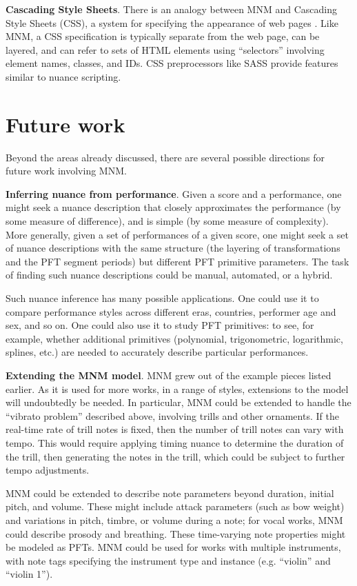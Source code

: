 \documentclass[letterpaper, 12pt]{article}
\begin{document}
\textbf{Cascading Style Sheets}.
There is an analogy between MNM and Cascading Style Sheets (CSS),
a system for specifying the appearance of web pages \citep{Lie1997}.
Like MNM, a CSS specification
is typically separate from the web page, can be layered,
and can refer to sets of HTML elements
using ``selectors'' involving element names, classes, and IDs.
CSS preprocessors like SASS \citep{Maxinanian2016}
provide features similar to nuance scripting.

\section{Future work}

Beyond the areas already discussed,
there are several possible directions for future work involving MNM.

\textbf{Inferring nuance from performance}.
Given a score and a performance,
one might seek a nuance description that
closely approximates the performance (by some measure of difference),
and is simple (by some measure of complexity).
More generally, given a set of performances of a given score,
one might seek a set of nuance descriptions with the same structure
(the layering of transformations and the PFT segment periods)
but different PFT primitive parameters.
The task of finding such nuance descriptions could
be manual, automated, or a hybrid.

Such nuance inference has many possible applications.
One could use it to compare performance styles across
different eras, countries, performer age and sex, and so on.
One could also use it to study PFT primitives:
to see, for example, whether additional primitives
(polynomial, trigonometric, logarithmic, splines, etc.)
are needed to accurately describe particular performances.

\textbf{Extending the MNM model}.
MNM grew out of the example pieces listed earlier.
As it is used for more works, in a range of styles,
extensions to the model will undoubtedly be needed.
In particular, MNM could be extended to handle the ``vibrato problem''
described above, involving trills and other ornaments.
If the real-time rate of trill notes is fixed,
then the number of trill notes can vary with tempo.
This would require
applying timing nuance to determine the duration of the trill,
then generating the notes in the trill,
which could be subject to further tempo adjustments.

MNM could be extended to describe note parameters
beyond duration, initial pitch, and volume.
These might include attack parameters (such as bow weight)
and variations in pitch, timbre, or volume during a note;
for vocal works, MNM could describe prosody and breathing.
These time-varying note properties might be modeled as PFTs.
MNM could be used for works with multiple instruments,
with note tags specifying the instrument type and instance
(e.g. ``violin'' and ``violin 1'').
\end{document}
